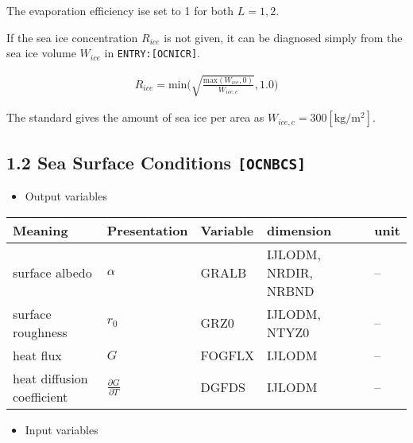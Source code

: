 The evaporation efficiency ise set to 1 for both \(L=1, 2\).

If the sea ice concentration \(R_{ice}\) is not given, it can be
diagnosed simply from the sea ice volume \(W_{ice}\) in
\texttt{ENTRY:{[}OCNICR{]}}.

\begin{eqnarray}
R_{ice} = \mathrm{min}\Big(\sqrt{\frac{\mathrm{max}(W_{ice},0)}{W_{ice,c}}},1.0\Big)
\end{eqnarray}

The standard gives the amount of sea ice per area as
\(W_{ice,c}=300 \mathrm{[kg/m^2]}\).

\hypertarget{sea-surface-conditions-ocnbcs}{%
\subsection{\texorpdfstring{1.2 Sea Surface Conditions
\texttt{{[}OCNBCS{]}}}{1.2 Sea Surface Conditions {[}OCNBCS{]}}}\label{sea-surface-conditions-ocnbcs}}

\begin{itemize}
\tightlist
\item
  Output variables
\end{itemize}

\setlength\LTleft{0pt}\setlength\LTright{0pt}\begin{longtable}[]{@{}lllll@{}}
\toprule\relax
Meaning & Presentation & Variable & dimension & unit \\
\midrule\relax
\endhead
surface albedo & \(\alpha\) & GRALB & IJLODM, NRDIR, NRBND & -- \\
surface roughness & \(r_0\) & GRZ0 & IJLODM, NTYZ0 & -- \\
heat flux & \(G\) & FOGFLX & IJLODM & -- \\
heat diffusion coefficient & \(\frac{\partial G}{\partial T}\) & DGFDS &
IJLODM & -- \\
\bottomrule
\end{longtable}

\begin{itemize}
\tightlist
\item
  Input variables
\end{itemize}

